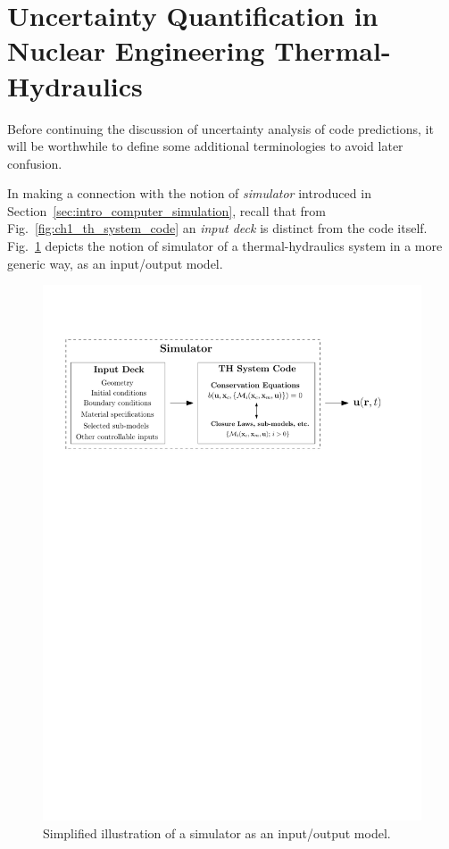 \section{Uncertainty Quantification in Nuclear Engineering Thermal-Hydraulics}\label{sec:intro_uncertainty_quantification}

Before continuing the discussion of uncertainty analysis of code predictions, it will be worthwhile to define some additional terminologies to avoid later confusion.

In making a connection with the notion of \emph{simulator} introduced in Section~\ref{sec:intro_computer_simulation}, 
recall that from Fig.~\ref{fig:ch1_th_system_code} an \emph{input deck} is distinct from the code itself.
Fig.~\ref{fig:ch1_simulator_io} depicts the notion of simulator of a thermal-hydraulics system in a more generic way, as an input/output model.
\begin{figure}[bth]	
	\centering
	\includegraphics[width=\textwidth]{../figures/chapter1/figures/simulator_io}
	\caption[Simplified illustration of a simulator as an input/output model.]{Simplified illustration of a simulator as an input/output model.}
	\label{fig:ch1_simulator_io}
\end{figure}

